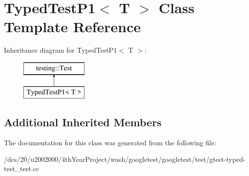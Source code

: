 \hypertarget{classTypedTestP1}{}\section{Typed\+Test\+P1$<$ T $>$ Class Template Reference}
\label{classTypedTestP1}
Inheritance diagram for Typed\+Test\+P1$<$ T $>$\+:\begin{figure}[H]
\begin{center}
\leavevmode
\includegraphics[height=2.000000cm]{classTypedTestP1}
\end{center}
\end{figure}
\subsection*{Additional Inherited Members}


The documentation for this class was generated from the following file\+:\begin{DoxyCompactItemize}
\item 
/dcs/20/u2002000/4th\+Year\+Project/wash/googletest/googletest/test/gtest-\/typed-\/test\+\_\+test.\+cc\end{DoxyCompactItemize}
